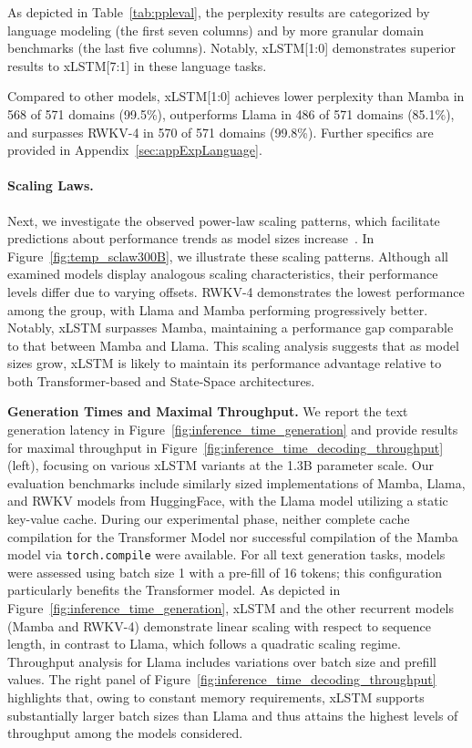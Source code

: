 As depicted in Table~\ref{tab:ppleval}, the perplexity results are categorized by language modeling (the first seven columns) and by more granular domain benchmarks (the last five columns). Notably, xLSTM[1:0] demonstrates superior results to xLSTM[7:1] in these language tasks.

Compared to other models, xLSTM[1:0] achieves lower perplexity than Mamba in 568 of 571 domains (99.5\%), outperforms Llama in 486 of 571 domains (85.1\%), and surpasses RWKV-4 in 570 of 571 domains (99.8\%). Further specifics are provided in Appendix~\ref{sec:appExpLanguage}.

\paragraph{Scaling Laws.} Next, we investigate the observed power-law scaling patterns, which facilitate predictions about performance trends as model sizes increase~\citep{Kaplan:20,Brown:20short}. In Figure~\ref{fig:temp_sclaw300B}, we illustrate these scaling patterns. Although all examined models display analogous scaling characteristics, their performance levels differ due to varying offsets. RWKV-4 demonstrates the lowest performance among the group, with Llama and Mamba performing progressively better. Notably, xLSTM surpasses Mamba, maintaining a performance gap comparable to that between Mamba and Llama. This scaling analysis suggests that as model sizes grow, xLSTM is likely to maintain its performance advantage relative to both Transformer-based and State-Space architectures.

\textbf{Generation Times and Maximal Throughput.} We report the text generation latency in Figure~\ref{fig:inference_time_generation} and provide results for maximal throughput in Figure~\ref{fig:inference_time_decoding_throughput} (left), focusing on various xLSTM variants at the 1.3B parameter scale. Our evaluation benchmarks include similarly sized implementations of Mamba, Llama, and RWKV models from HuggingFace, with the Llama model utilizing a static key-value cache. During our experimental phase, neither complete cache compilation for the Transformer Model nor successful compilation of the Mamba model via \texttt{torch.compile} were available. For all text generation tasks, models were assessed using batch size 1 with a pre-fill of 16 tokens; this configuration particularly benefits the Transformer model. As depicted in Figure~\ref{fig:inference_time_generation}, xLSTM and the other recurrent models (Mamba and RWKV-4) demonstrate linear scaling with respect to sequence length, in contrast to Llama, which follows a quadratic scaling regime. Throughput analysis for Llama includes variations over batch size and prefill values. The right panel of Figure~\ref{fig:inference_time_decoding_throughput} highlights that, owing to constant memory requirements, xLSTM supports substantially larger batch sizes than Llama and thus attains the highest levels of throughput among the models considered.

